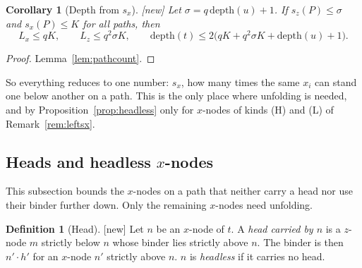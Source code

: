 \documentclass[11pt]{article}
\newcommand{\depth}{\mathrm{depth}}
\newcommand{\suc}[2]{#1{\cdot}#2}
\newcommand{\New}{\textsf{[new]}}
\theoremstyle{plain}
\newtheorem{corollary}[theorem]{Corollary}
\theoremstyle{definition}
\newtheorem{definition}[theorem]{Definition}
\theoremstyle{remark}
\begin{document}
\begin{corollary}[Depth from $s_x$]\label{cor:depthsz}
\New{} Let $\sigma=q\,\depth(u)+1$.  If $s_z(P)\le\sigma$ and $s_x(P)\le K$
for all paths, then
\[
L_x\le qK,\qquad L_z\le q^2\sigma K,\qquad
\depth(t)\le 2\bigl(qK+q^2\sigma K+\depth(u)+1\bigr).
\]
\end{corollary}
\begin{proof}
Lemma~\ref{lem:pathcount}.
\end{proof}

So everything reduces to one number: $s_x$, how many times the same
$x_i$ can stand one below another on a path.  This is the only place
where unfolding is needed, and by Proposition~\ref{prop:headless} only
for $x$-nodes of kinds (H) and (L) of Remark~\ref{rem:leftsx}.

\subsection{Heads and headless $x$-nodes}\label{sec:heads}

This subsection bounds the $x$-nodes on a path that neither carry a head
nor use their binder further down.  Only the remaining $x$-nodes need
unfolding.

\begin{definition}[Head]\label{def:head}
\New{} Let $n$ be an $x$-node of $t$.  A \emph{head carried by $n$} is a
$z$-node $m$ strictly below $n$ whose binder lies strictly above $n$.
The binder is then $\suc{n'}{h'}$ for an $x$-node $n'$ strictly above
$n$.  $n$ is \emph{headless} if it carries no head.
\end{definition}
\end{document}
